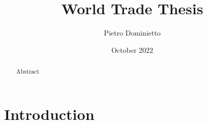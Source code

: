 \documentclass{article}
\title{World Trade Thesis}
\author{Pietro Dominietto}
\date{October 2022}
\begin{document}
\maketitle

\begin{abstract}
Abstract
\end{abstract}


\tableofcontents

\pagebreak

\section{Introduction}
\end{document}
